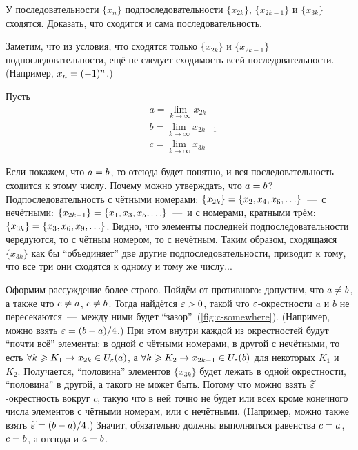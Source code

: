 \documentclass[a4paper,12pt]{article}
\begin{document}
  У последовательности $\{x_n\}$ подпоследовательности $\{x_{2k}\}$, $\{x_{2k - 1}\}$ и $\{x_{3k}\}$ сходятся.
  Доказать, что сходится и сама последовательность.
  
  \begin{solution}
    Заметим, что из условия, что сходятся только $\{x_{2k}\}$ и $\{x_{2k - 1}\}$ подпоследовательности, ещё не следует сходимость всей последовательности.
    (Например, $x_n \hm= (-1)^n$.)
    
    Пусть
    \[
      \begin{aligned}
        &a = \lim\limits_{k \to \infty} x_{2k}\\
        &b = \lim\limits_{k \to \infty} x_{2k - 1}\\
        &c = \lim\limits_{k \to \infty} x_{3k}
      \end{aligned}
    \]
    
    Если покажем, что $a \hm= b$, то отсюда будет понятно, и вся последовательность сходится к этому числу.
    Почему можно утверждать, что $a \hm= b$?
    Подпоследовательность с чётными номерами: $\{x_{2k}\} \hm= \{x_2, x_4, x_6, \ldots\}$~---~с нечётными: $\{x_{2k - 1}\} \hm= \{x_1, x_3, x_5, \ldots\}$~---~и с номерами, кратными трём: $\{x_{3k}\} \hm= \{x_3, x_6, x_9, \ldots\}$.
    Видно, что элементы последней подпоследовательности чередуются, то с чётным номером, то с нечётным.
    Таким образом, сходящаяся $\{x_{3k}\}$ как бы ``объединяет'' две другие подпоследовательности, приводит к тому, что все три они сходятся к одному и тому же числу...
    
    Оформим рассуждение более строго.
    Пойдём от противного: допустим, что $a \hm{\not=} b$, а также что $c \hm{\not=} a$, $c \hm{\not=} b$.
    Тогда найдётся $\eps \hm> 0$, такой что $\varepsilon$-окрестности $a$ и $b$ не пересекаются~---~между ними будет ``зазор''~(\ref{fig:c-somewhere}).
    (Например, можно взять $\eps \hm= (b \hm- a) \hm/ 4$.)
    При этом внутри каждой из окрестностей будут ``почти всё'' элементы: в одной с чётными номерами, в другой с нечётными, то есть $\forall k \hm\geq K_1 \hm\to x_{2k} \hm\in U_{\eps}(a)$, а $\forall k \hm\geq K_2 \hm\to x_{2k - 1} \hm\in U_{\eps}(b)$ для некоторых $K_1$ и $K_2$.
    Получается, ``половина'' элементов $\{x_{3k}\}$ будет лежать в одной окрестности, ``половина'' в другой, а такого не может быть.
    Потому что можно взять $\widetilde {\varepsilon}$-окрестность вокруг $c$, такую что в ней точно не будет или всех кроме конечного числа элементов с чётными номерам, или с нечётными.
    (Например, можно также взять $\widetilde \eps \hm= (b \hm- a) \hm/ 4$.)
    Значит, обязательно должны выполняться равенства $c \hm= a$, $c \hm= b$, а отсюда и $a \hm= b$.
    

\end{solution}
\end{document}
